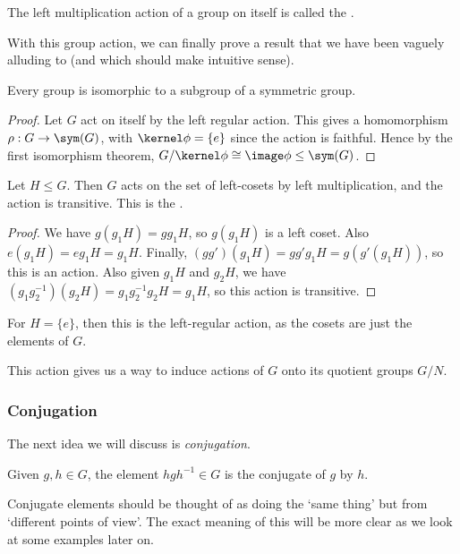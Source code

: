 \documentclass[a4paper]{scrartcl}
\newcommand{\newsubsection}{\subsubsection}
\begin{document}
\begin{definition}
	The left multiplication action of a group on itself is called the .
\end{definition}

With this group action, we can finally prove a result that we have been vaguely alluding to (and which should make intuitive sense).

\begin{theorem}
	Every group is isomorphic to a subgroup of a symmetric group. 
\end{theorem}
\begin{proof}
	Let $G$ act on itself by the left regular action. This gives a homomorphism $\rho: G \rightarrow \sym(G)$,
	with $\kernel \phi = \{e\}$ since the action is faithful. Hence by the first isomorphism theorem, $G/\kernel \phi \cong \image\phi \leq \sym(G)$.
\end{proof}

\begin{proposition}
	Let $H \leq G$. Then $G$ acts on the set of left-cosets by left multiplication, and the action is transitive. This is the .
\end{proposition}
\begin{proof}
	We have $g(g_1H) = gg_1 H$, so $g(g_1H)$ is a left coset. Also $e(g_1H) = e g_1 H = g_1 H$. Finally, $(gg')(g_1 H) = g g' g_1 H = g(g'(g_1 H))$, so this is an action. Also given $g_1 H$ and $g_2 H$, we have $(g_1 g_2^{-1})(g_2 H) = g_1 g_2^{-1} g_2 H = g_1 H$, so this action is transitive.
\end{proof}
\begin{remark}
	For $H = \{e\}$, then this is the left-regular action, as the cosets are just the elements of $G$.
\end{remark}
This action gives us a way to induce actions of $G$ onto its quotient groups $G/N$.

\newsubsection{Conjugation}

The next idea we will discuss is \emph{conjugation}.

\begin{definition}[Conugation]
	Given $g, h \in G$, the element $h g h^{-1} \in G$ is the conjugate of $g$ by $h$.
\end{definition}

Conjugate elements should be thought of as doing the `same thing' but from `different points of view'. The exact meaning of this will be more clear as we look at some examples later on.
\end{document}

